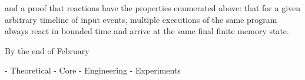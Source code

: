 \documentclass[12pt,english]{amsart}
\begin{document}
 and a proof that reactions have the properties enumerated above: that for a given arbitrary timeline of input events, multiple executions of the same program always react in bounded time and arrive at the same final finite memory state.

By the end of February

- Theoretical
- Core
- Engineering
- Experiments

\end{document}
